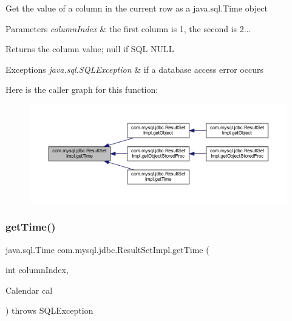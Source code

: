 Get the value of a column in the current row as a java.\+sql.\+Time object


\begin{DoxyParams}{Parameters}
{\em column\+Index} & the first column is 1, the second is 2...\\
\hline
\end{DoxyParams}
\begin{DoxyReturn}{Returns}
the column value; null if S\+QL N\+U\+LL
\end{DoxyReturn}

\begin{DoxyExceptions}{Exceptions}
{\em java.\+sql.\+S\+Q\+L\+Exception} & if a database access error occurs \\
\hline
\end{DoxyExceptions}
Here is the caller graph for this function\+:
\nopagebreak
\begin{figure}[H]
\begin{center}
\leavevmode
\includegraphics[width=350pt]{classcom_1_1mysql_1_1jdbc_1_1_result_set_impl_a8eba20925d3ad454aba811f47ac4de65_icgraph}
\end{center}
\end{figure}
\mbox{\label{classcom_1_1mysql_1_1jdbc_1_1_result_set_impl_a36995a9baa7703f1ff95ef398736a7c1}} 
\subsubsection{\texorpdfstring{get\+Time()}{getTime()}\hspace{0.1cm}{\footnotesize\ttfamily [2/4]}}
{\footnotesize\ttfamily java.\+sql.\+Time com.\+mysql.\+jdbc.\+Result\+Set\+Impl.\+get\+Time (\begin{DoxyParamCaption}\item[{int}]{column\+Index,  }\item[{Calendar}]{cal }\end{DoxyParamCaption}) throws S\+Q\+L\+Exception}

